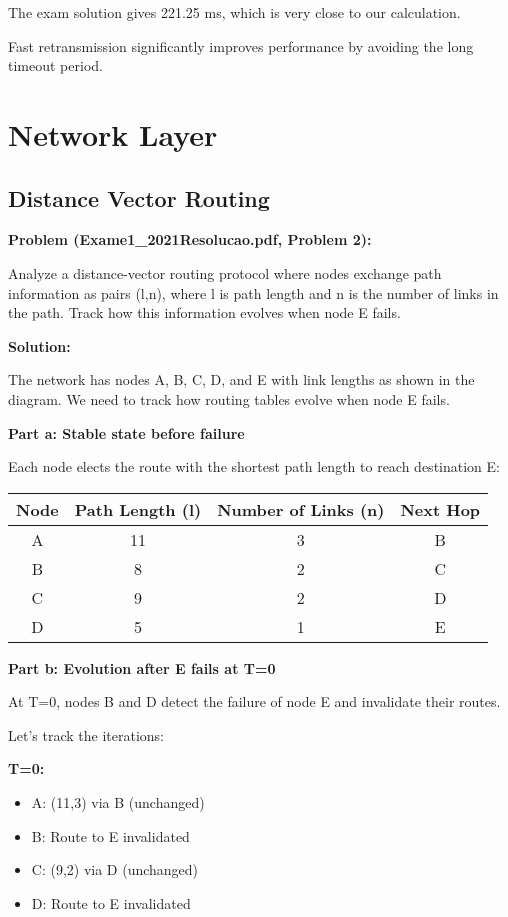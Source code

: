 \documentclass[11pt,a4paper]{article}
\begin{document}
The exam solution gives 221.25 ms, which is very close to our calculation.

Fast retransmission significantly improves performance by avoiding the long timeout period.

\section{Network Layer}

\subsection{Distance Vector Routing}
\textbf{Problem (Exame1\_2021Resolucao.pdf, Problem 2):}

Analyze a distance-vector routing protocol where nodes exchange path information as pairs (l,n), where l is path length and n is the number of links in the path. Track how this information evolves when node E fails.

\textbf{Solution:}

The network has nodes A, B, C, D, and E with link lengths as shown in the diagram. We need to track how routing tables evolve when node E fails.

\textbf{Part a: Stable state before failure}

Each node elects the route with the shortest path length to reach destination E:

\begin{tabular}{|c|c|c|c|}
\hline
Node & Path Length (l) & Number of Links (n) & Next Hop \\
\hline
A & 11 & 3 & B \\
B & 8 & 2 & C \\
C & 9 & 2 & D \\
D & 5 & 1 & E \\
\hline
\end{tabular}

\textbf{Part b: Evolution after E fails at T=0}

At T=0, nodes B and D detect the failure of node E and invalidate their routes.

Let's track the iterations:

\textbf{T=0:}
\begin{itemize}
    \item A: (11,3) via B (unchanged)
    \item B: Route to E invalidated
    \item C: (9,2) via D (unchanged)
    \item D: Route to E invalidated
\end{itemize}
\end{document}
